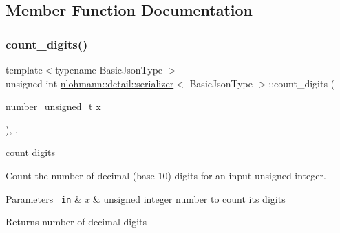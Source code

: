 \subsection{Member Function Documentation}
\mbox{\label{classnlohmann_1_1detail_1_1serializer_a10692e98ea1f5a64de1d0b8e0e724b99}} 
\subsubsection{\texorpdfstring{count\_digits()}{count\_digits()}}
{\footnotesize\ttfamily template$<$typename Basic\+Json\+Type $>$ \\
unsigned int \mbox{\hyperlink{classnlohmann_1_1detail_1_1serializer}{nlohmann\+::detail\+::serializer}}$<$ Basic\+Json\+Type $>$\+::count\+\_\+digits (\begin{DoxyParamCaption}\item[{\mbox{\hyperlink{classnlohmann_1_1detail_1_1serializer_a16c7b7a726a38ff0c06dce7ba7968391}{number\+\_\+unsigned\+\_\+t}}}]{x }\end{DoxyParamCaption})\hspace{0.3cm}{\ttfamily [inline]}, {\ttfamily [private]}, {\ttfamily [noexcept]}}



count digits 

Count the number of decimal (base 10) digits for an input unsigned integer.


\begin{DoxyParams}[1]{Parameters}
\mbox{\texttt{ in}}  & {\em x} & unsigned integer number to count its digits \\
\hline
\end{DoxyParams}
\begin{DoxyReturn}{Returns}
number of decimal digits 
\end{DoxyReturn}
\mbox{\label{classnlohmann_1_1detail_1_1serializer_abdcc4fd1dc5d3afb6c0817e4c89b1242}} 

